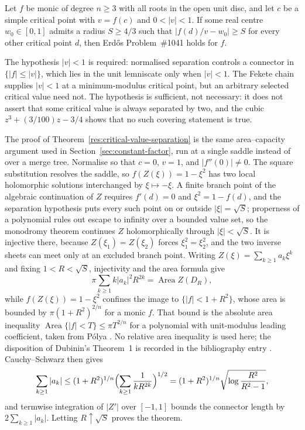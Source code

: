\documentclass[11pt]{article}
\begin{document}
\begin{corollary}\label{res:separation-parent}
Let $f$ be monic of degree $n\ge3$ with all roots in the open unit disc, and
let $c$ be a simple critical point with $v=f(c)$ and $0<|v|<1$.  If some real centre
$w_0\in[0,1]$ admits a radius $S\ge4/3$ such that $|f(d)/v-w_0|\ge S$ for
every other critical point $d$, then Erd\H{o}s Problem~\#1041 holds for $f$.
\end{corollary}

\noindent The hypothesis $|v|<1$ is required: normalised separation controls a
connector in $\{|f|\le|v|\}$, which lies in the unit lemniscate only when
$|v|<1$.  The Fekete chain supplies $|v|<1$ at a minimum-modulus critical
point, but an arbitrary selected critical value need not.
The hypothesis is sufficient, not necessary: it does not assert that some
critical value is always separated by two, and the cubic
$z^3+(3/100)z-3/4$ shows that no such covering statement is true.

The proof of Theorem~\ref{res:critical-value-separation} is the same
area--capacity argument used in Section~\ref{sec:constant-factor}, run at a
single saddle instead of over a merge tree.  Normalise so that $c=0$, $v=1$,
and $|f''(0)|\ne0$.  The square substitution resolves the saddle, so
$f(Z(\xi))=1-\xi^2$ has two local holomorphic solutions interchanged by
$\xi\mapsto-\xi$.  A finite branch point of the algebraic continuation of $Z$
requires $f'(d)=0$ and $\xi^2=1-f(d)$, and the separation hypothesis puts every
such point on or outside $|\xi|=\sqrt S$; properness of a polynomial rules out
escape to infinity over a bounded value set, so the monodromy theorem continues
$Z$ holomorphically through $|\xi|<\sqrt S$.  It is injective there, because
$Z(\xi_1)=Z(\xi_2)$ forces $\xi_1^2=\xi_2^2$, and the two inverse sheets can
meet only at an excluded branch point.  Writing $Z(\xi)=\sum_{k\ge1}a_k\xi^k$
and fixing $1<R<\sqrt S$, injectivity and the area formula give
\[
  \pi\sum_{k\ge1}k|a_k|^2R^{2k}=\operatorname{Area}Z(D_R),
\]
while $f(Z(\xi))=1-\xi^2$ confines the image to $\{|f|<1+R^2\}$, whose area
is bounded by $\pi(1+R^2)^{2/n}$ for a monic $f$.  That bound is the absolute
area inequality $\operatorname{Area}\{|f|<T\}\le\pi T^{2/n}$ for a polynomial
with unit-modulus leading coefficient, taken from P\'olya
\cite[printed pp.~280--282]{polya1928}.  No relative area inequality is used
here; the disposition of Dubinin's Theorem~1 is recorded in the bibliography
entry \cite{dubinin}.  Cauchy--Schwarz then gives
\[
  \sum_{k\ge1}|a_k|
    \le(1+R^2)^{1/n}\Bigl(\sum_{k\ge1}\frac1{kR^{2k}}\Bigr)^{1/2}
    =(1+R^2)^{1/n}\sqrt{\log\frac{R^2}{R^2-1}},
\]
and termwise integration of $|Z'|$ over $[-1,1]$ bounds the connector length by
$2\sum_{k\ge1}|a_k|$.  Letting $R\uparrow\sqrt S$ proves the theorem.
\end{document}
